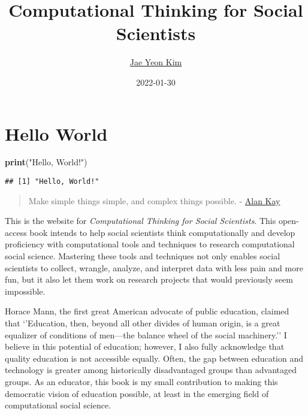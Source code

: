 \documentclass[
]{book}
\title{Computational Thinking for Social Scientists}
\author{\href{https://jaeyk.github.io/}{Jae Yeon Kim}}
\date{2022-01-30}
\newenvironment{Shaded}{\begin{snugshade}}{\end{snugshade}}
\newcommand{\KeywordTok}[1]{\textcolor[rgb]{0.13,0.29,0.53}{\textbf{#1}}}
\newcommand{\NormalTok}[1]{#1}
\newcommand{\StringTok}[1]{\textcolor[rgb]{0.31,0.60,0.02}{#1}}
\begin{document}
\maketitle

{
\hypersetup{linkcolor=}
\setcounter{tocdepth}{1}
\tableofcontents
}
\hypertarget{hello-world}{%
\chapter{Hello World}\label{hello-world}}

\begin{Shaded}
\begin{Highlighting}[]
\KeywordTok{print}\NormalTok{(}\StringTok{"Hello, World!"}\NormalTok{)}
\end{Highlighting}
\end{Shaded}

\begin{verbatim}
## [1] "Hello, World!"
\end{verbatim}

\begin{quote}
Make simple things simple, and complex things possible. - \href{https://www.quora.com/What-is-the-story-behind-Alan-Kay-s-adage-Simple-things-should-be-simple-complex-things-should-be-possible}{Alan Kay}
\end{quote}

This is the website for \emph{Computational Thinking for Social Scientists}. This open-access book intends to help social scientists think computationally and develop proficiency with computational tools and techniques to research computational social science. Mastering these tools and techniques not only enables social scientists to collect, wrangle, analyze, and interpret data with less pain and more fun, but it also let them work on research projects that would previously seem impossible.

Horace Mann, the first great American advocate of public education, claimed that `'Education, then, beyond all other divides of human origin, is a great equalizer of conditions of men---the balance wheel of the social machinery.'' I believe in this potential of education; however, I also fully acknowledge that quality education is not accessible equally. Often, the gap between education and technology is greater among historically disadvantaged groups than advantaged groups. As an educator, this book is my small contribution to making this democratic vision of education possible, at least in the emerging field of computational social science.
\end{document}
